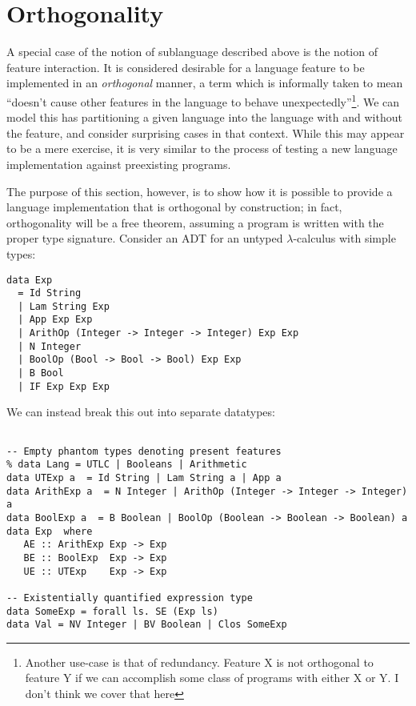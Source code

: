 \documentclass[12pt]{article}
\begin{document}
\section{Orthogonality}

A special case of the notion of sublanguage described above is the notion of
feature interaction. It is considered desirable for a language feature to be
implemented in an \emph{orthogonal} manner, a term which is informally taken to
mean ``doesn't cause other features in the language to behave
unexpectedly''\footnote{Another use-case is that of redundancy. Feature X is not
orthogonal to feature Y if we can accomplish some class of programs with either
X or Y. I don't think we cover that here}. We can model this has partitioning a
given language into the language with and without the feature, and consider
surprising cases in that context. While this may appear to be a mere exercise,
it is very similar to the process of testing a new language implementation
against preexisting programs.

The purpose of this section, however, is to show how it is possible to provide a
language implementation that is orthogonal by construction; in fact,
orthogonality will be a free theorem, assuming a program is written with the
proper type signature. Consider an ADT for an untyped $\lambda$-calculus with
simple types:

\begin{verbatim}
data Exp 
  = Id String 
  | Lam String Exp 
  | App Exp Exp 
  | ArithOp (Integer -> Integer -> Integer) Exp Exp 
  | N Integer
  | BoolOp (Bool -> Bool -> Bool) Exp Exp
  | B Bool
  | IF Exp Exp Exp
\end{verbatim}


We can instead break this out into separate datatypes:

\begin{verbatim}

-- Empty phantom types denoting present features
% data Lang = UTLC | Booleans | Arithmetic
data UTExp a  = Id String | Lam String a | App a
data ArithExp a  = N Integer | ArithOp (Integer -> Integer -> Integer) a
data BoolExp a  = B Boolean | BoolOp (Boolean -> Boolean -> Boolean) a
data Exp  where
   AE :: ArithExp Exp -> Exp 
   BE :: BoolExp  Exp -> Exp 
   UE :: UTExp    Exp -> Exp 
  
-- Existentially quantified expression type
data SomeExp = forall ls. SE (Exp ls)
data Val = NV Integer | BV Boolean | Clos SomeExp 
\end{verbatim}
\end{document}
